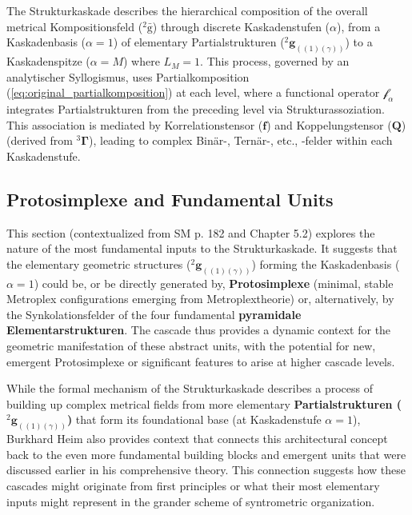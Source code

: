 \documentclass[12pt]{article}
\newcommand{\kompositionsfeld}{{}^2\bar{\mathrm{g}}}
\newcommand{\partialstruktur}[1]{{}^2\mathbf{g}_{(#1)}}
\newcommand{\fundamentalkondensor}{{}^3\bm{\Gamma}}
\newcommand{\korrelationstensor}{\mathbf{f}}
\newcommand{\koppelungstensor}{\mathbf{Q}}
\newcommand{\kaskadenstufe}{\alpha}
\begin{document}
The Strukturkaskade describes the hierarchical composition of the overall metrical Kompositionsfeld (\(\kompositionsfeld\)) through discrete Kaskadenstufen (\(\kaskadenstufe\)), from a Kaskadenbasis (\(\kaskadenstufe=1\)) of elementary Partialstrukturen (\(\partialstruktur{(1)(\gamma)}\)) to a Kaskadenspitze (\(\kaskadenstufe=M\)) where $L_M=1$. This process, governed by an analytischer Syllogismus, uses Partialkomposition (\eqref{eq:original_partialkomposition}) at each level, where a functional operator \(\mathcal{f}_\alpha\) integrates Partialstrukturen from the preceding level via Strukturassoziation. This association is mediated by Korrelationstensor (\(\korrelationstensor\)) and Koppelungstensor (\(\koppelungstensor\)) (derived from \(\fundamentalkondensor\)), leading to complex Binär-, Ternär-, etc., -felder within each Kaskadenstufe.

\subsection{Protosimplexe and Fundamental Units}
\label{sec:cascade_protosimplexe}

This section (contextualized from SM p. 182 and Chapter 5.2) explores the nature of the most fundamental inputs to the Strukturkaskade. It suggests that the elementary geometric structures (\(\partialstruktur{(1)(\gamma)}\)) forming the Kaskadenbasis (\(\kaskadenstufe=1\)) could be, or be directly generated by, \textbf{Protosimplexe} (minimal, stable Metroplex configurations emerging from Metroplextheorie) or, alternatively, by the Synkolationsfelder of the four fundamental \textbf{pyramidale Elementarstrukturen}. The cascade thus provides a dynamic context for the geometric manifestation of these abstract units, with the potential for new, emergent Protosimplexe or significant features to arise at higher cascade levels.

While the formal mechanism of the Strukturkaskade describes a process of building up complex metrical fields from more elementary \textbf{Partialstrukturen (\(\partialstruktur{(1)(\gamma)}\))} that form its foundational base (at Kaskadenstufe \( \kaskadenstufe=1 \)), Burkhard Heim also provides context that connects this architectural concept back to the even more fundamental building blocks and emergent units that were discussed earlier in his comprehensive theory. This connection suggests how these cascades might originate from first principles or what their most elementary inputs might represent in the grander scheme of syntrometric organization.
\end{document}
